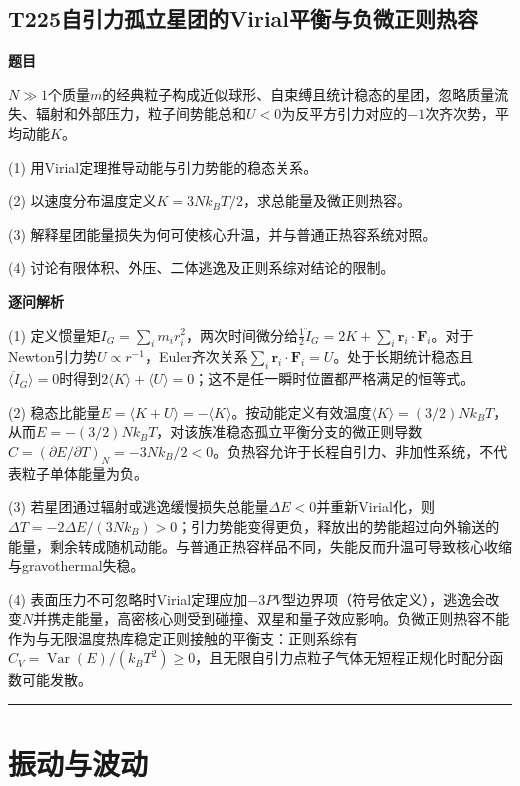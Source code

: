 \documentclass[UTF8,a4paper,11pt,oneside,openany]{ctexbook}
\begin{document}
\section*{T225\quad 自引力孤立星团的Virial平衡与负微正则热容}
\textbf{题目}\par
$N\gg1$个质量$m$的经典粒子构成近似球形、自束缚且统计稳态的星团，忽略质量流失、辐射和外部压力，粒子间势能总和$U<0$为反平方引力对应的$-1$次齐次势，平均动能$K$。
\par\smallskip\noindent (1) 用Virial定理推导动能与引力势能的稳态关系。
\par\smallskip\noindent (2) 以速度分布温度定义$K=3Nk_BT/2$，求总能量及微正则热容。
\par\smallskip\noindent (3) 解释星团能量损失为何可使核心升温，并与普通正热容系统对照。
\par\smallskip\noindent (4) 讨论有限体积、外压、二体逃逸及正则系综对结论的限制。
\par\medskip\textbf{逐问解析}\par
\par\smallskip\noindent (1) 定义惯量矩$I_G=\sum_im_ir_i^2$，两次时间微分给$\frac12\ddot I_G=2K+\sum_i\boldsymbol r_i\cdot\boldsymbol F_i$。对于Newton引力势$U\propto r^{-1}$，Euler齐次关系$\sum_i\boldsymbol r_i\cdot\boldsymbol F_i=U$。处于长期统计稳态且$\langle\ddot I_G\rangle=0$时得到$2\langle K\rangle+\langle U\rangle=0$；这不是任一瞬时位置都严格满足的恒等式。
\par\smallskip\noindent (2) 稳态比能量$E=\langle K+U\rangle=-\langle K\rangle$。按动能定义有效温度$\langle K\rangle=(3/2)Nk_BT$，从而$E=-(3/2)Nk_BT$，对该族准稳态孤立平衡分支的微正则导数$C=(\partial E/\partial T)_N=-3Nk_B/2<0$。负热容允许于长程自引力、非加性系统，不代表粒子单体能量为负。
\par\smallskip\noindent (3) 若星团通过辐射或逃逸缓慢损失总能量$\Delta E<0$并重新Virial化，则$\Delta T=-2\Delta E/(3Nk_B)>0$；引力势能变得更负，释放出的势能超过向外输送的能量，剩余转成随机动能。与普通正热容样品不同，失能反而升温可导致核心收缩与gravothermal失稳。
\par\smallskip\noindent (4) 表面压力不可忽略时Virial定理应加$-3PV$型边界项（符号依定义），逃逸会改变$N$并携走能量，高密核心则受到碰撞、双星和量子效应影响。负微正则热容不能作为与无限温度热库稳定正则接触的平衡支：正则系综有$C_V=\operatorname{Var}(E)/(k_BT^2)\ge0$，且无限自引力点粒子气体无短程正规化时配分函数可能发散。
\par\medskip\hrule\medskip
\chapter{振动与波动}
\end{document}
